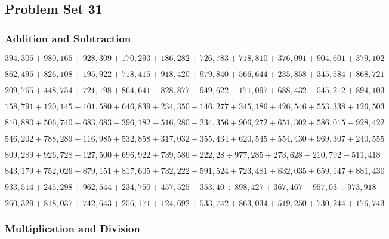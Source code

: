 \hypertarget{problem-set-31-5}{%
\subsection{Problem Set 31}\label{problem-set-31-5}}

\hypertarget{addition-and-subtraction-336}{%
\subsubsection{Addition and
Subtraction}\label{addition-and-subtraction-336}}

\(394,305+980,165+928,309+170,293+186,282+726,783+718,810+376,091+904,601+ 379,102\)

\(862,495+826,108+195,922+718,415+918,420+979,840+566,644+235,858+345,584+868,721\)

\(209,765+448,754+721,198+864,641-828,877-949,622-171,097+688,432-545,212+894,103\)

\(158,791+120,145+101,580+646,839+234,350+146,277+345,186+426,546+553,338+126,503\)

\(810,880+506,740+683,683-396,182-516,280-234,356+906,272+651,302+586,015-928,422\)

\(546,202+788,289+116,985+532,858+317,032+355,434+620,545+554,430+969,307+240,555\)

\(809,289+926,728-127,500+696,922+739,586+222,28÷977,285+273,628-210,792-511,418\)

\(843,179+752,026+879,151+817,605+732,222+591,524+723,481+832,035+659,147+881,430\)

\(933,514+245,298+962,544+234,750+457,525-353,40÷898,427+367,467-957,03÷973,918\)

\(260,329+818,037+742,643+256,171+124,692+533,742+863,034+519,250+730,244+176,743\)

\hypertarget{multiplication-and-division-335}{%
\subsubsection{Multiplication and
Division}\label{multiplication-and-division-335}}

